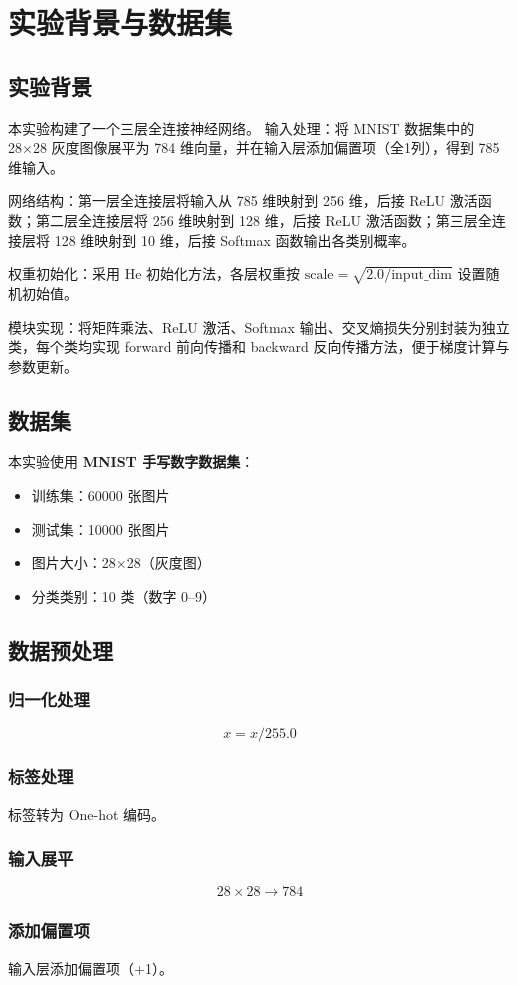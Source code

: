 \section{实验背景与数据集}

\subsection{实验背景}
本实验构建了一个三层全连接神经网络。
输入处理：将 MNIST 数据集中的 28×28 灰度图像展平为 784 维向量，并在输入层添加偏置项（全1列），得到 785 维输入。

网络结构：第一层全连接层将输入从 785 维映射到 256 维，后接 ReLU 激活函数；第二层全连接层将 256 维映射到 128 维，后接 ReLU 激活函数；第三层全连接层将 128 维映射到 10 维，后接 Softmax 函数输出各类别概率。

权重初始化：采用 He 初始化方法，各层权重按 $\mathrm{scale} = \sqrt{2.0 / \mathrm{input\_dim}}$ 设置随机初始值。

模块实现：将矩阵乘法、ReLU 激活、Softmax 输出、交叉熵损失分别封装为独立类，每个类均实现 forward 前向传播和 backward 反向传播方法，便于梯度计算与参数更新。
\subsection{数据集}

本实验使用 \textbf{MNIST 手写数字数据集}：

\begin{itemize}
\item 训练集：60000 张图片
\item 测试集：10000 张图片
\item 图片大小：28×28（灰度图）
\item 分类类别：10 类（数字 0–9）
\end{itemize}

\subsection{数据预处理}

\subsubsection{归一化处理}

\[
x = x / 255.0
\]

\subsubsection{标签处理}

标签转为 One-hot 编码。

\subsubsection{输入展平}

\[
28 \times 28 \rightarrow 784
\]

\subsubsection{添加偏置项}

输入层添加偏置项（+1）。

